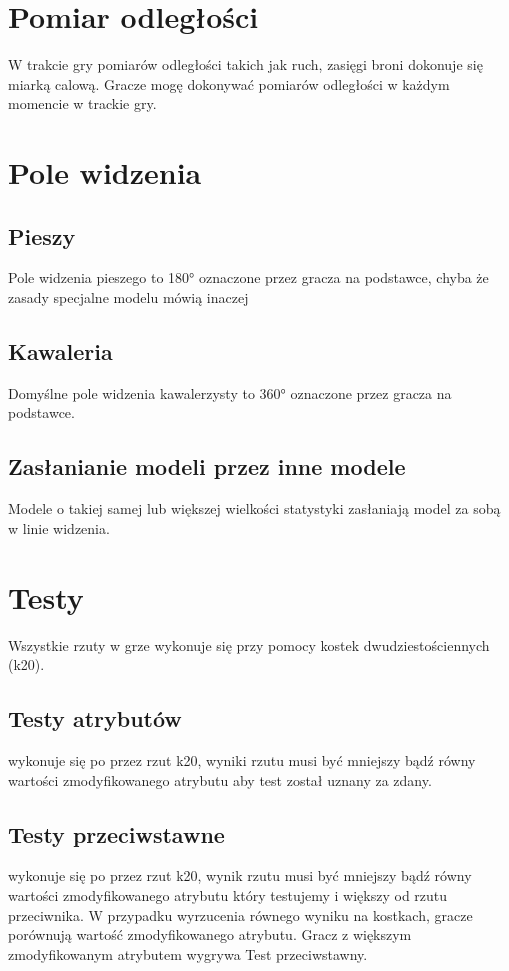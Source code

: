 \section{Pomiar odległości}
W trakcie gry pomiarów odległości takich jak ruch, zasięgi broni dokonuje się miarką calową. Gracze mogę dokonywać pomiarów odległości w każdym momencie w trackie gry. 

\section{Pole widzenia}

\subsection{Pieszy}
Pole widzenia pieszego to \ang{180} oznaczone przez gracza na podstawce, chyba że zasady specjalne modelu mówią inaczej

\subsection{Kawaleria}
Domyślne pole widzenia kawalerzysty to \ang{360} oznaczone przez gracza na podstawce. 

\subsection{Zasłanianie modeli przez inne modele}
Modele o takiej samej lub większej wielkości statystyki zasłaniają model za sobą w linie widzenia. 

\section{Testy}

Wszystkie rzuty w grze wykonuje się przy pomocy kostek dwudziestościennych (k20).

\subsection{Testy atrybutów} wykonuje się po przez rzut k20, wyniki rzutu musi być mniejszy bądź równy wartości zmodyfikowanego atrybutu aby test został uznany za zdany. 

\subsection{Testy przeciwstawne} wykonuje się po przez rzut k20, wynik rzutu musi być mniejszy bądź równy wartości zmodyfikowanego atrybutu który testujemy i większy od rzutu przeciwnika. W przypadku wyrzucenia równego wyniku na kostkach, gracze porównują wartość zmodyfikowanego atrybutu. Gracz z większym zmodyfikowanym atrybutem wygrywa Test przeciwstawny. 

